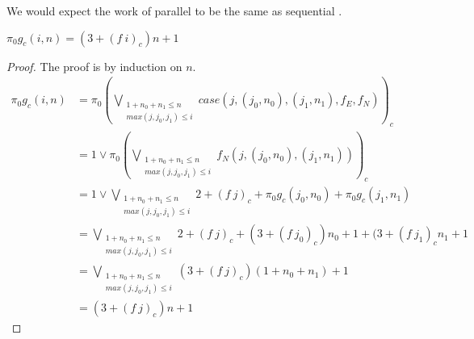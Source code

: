 %
We would expect the work of parallel  to be the same as sequential .
%
\begin{lemma}
  $\pi_0 g_c(i,n) = (3 + (f\ i)_c)n + 1$
\end{lemma}
\begin{proof}
  The proof is by induction on $n$.
  \begin{align*}
    \pi_0g_c(i,n) &= \pi_0 (\bigvee\limits_{\substack{1 + n_0 + n_1 \leq n \\ max(j,j_0,j_1) \leq i}} case(j,(j_0,n_0),(j_1,n_1), f_E, f_N))_c \\
                  &= 1 \vee \pi_0 (\bigvee\limits_{\substack{1 + n_0 + n_1 \leq n \\ max(j,j_0,j_1) \leq i}} f_N(j,(j_0,n_0),(j_1,n_1)))_c \\
                  &= 1 \vee \bigvee\limits_{\substack{1 + n_0 + n_1 \leq n \\ max(j,j_0,j_1) \leq i}} 2 + (f\ j)_c + \pi_0 g_c(j_0,n_0) + \pi_0 g_c(j_1,n_1) \\
                  &= \bigvee\limits_{\substack{1 + n_0 + n_1 \leq n \\ max(j,j_0,j_1) \leq i}} 2 + (f\ j)_c + (3 + (f\ j_0)_c) n_0 + 1 + (3 + (f\ j_1)_c n_1 + 1 \\
                  &= \bigvee\limits_{\substack{1 + n_0 + n_1 \leq n \\ max(j,j_0,j_1) \leq i}} (3 + (f\ j)_c)(1 + n_0 + n_1) + 1  \\
                  &= (3 + (f\ j)_c)n + 1
  \end{align*}
\end{proof}
%

